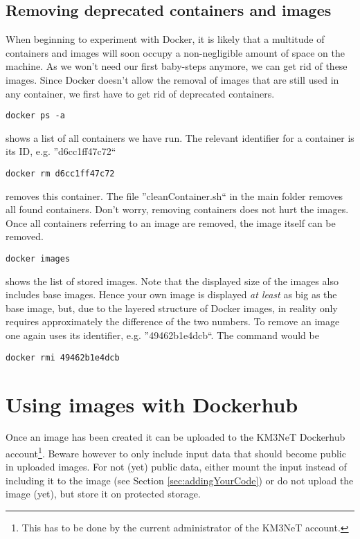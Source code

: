 \documentclass[a4paper, twoside, 11pt]{article}
\begin{document}
\subsection{Removing deprecated containers and images}
When beginning to experiment with Docker, it is likely that a multitude of containers and images will  
soon occupy a non-negligible amount of space on the machine. 
As we won't need our first baby-steps anymore, we can get rid of these images. 
Since Docker doesn't allow the removal of images that are still used in any container, 
we first have to get rid of deprecated containers. 
\begin{lstlisting}[basicstyle=\ttfamily\small,upquote=true,columns=flexible,keepspaces=true,frame=single]
docker ps -a
\end{lstlisting}
shows a list of all containers we have run. 
The relevant identifier for a container is its ID, e.g. ''d6cc1ff47c72``
\begin{lstlisting}[basicstyle=\ttfamily\small,upquote=true,columns=flexible,keepspaces=true,frame=single]
docker rm d6cc1ff47c72
\end{lstlisting}
removes this container. 
The file ''cleanContainer.sh`` in the main folder removes all found containers. 
Don't worry, removing containers does not hurt the images. 
Once all containers referring to an image are removed, the image itself can be removed.
\begin{lstlisting}[basicstyle=\ttfamily\small,upquote=true,columns=flexible,keepspaces=true,frame=single]
docker images
\end{lstlisting}
shows the list of stored images. 
Note that the displayed size of the images also includes base images. 
Hence your own image is displayed \textit{at least} as big as the base image, 
but, due to the layered structure of Docker images, in reality only requires approximately the difference of the two numbers. 
To remove an image one again uses its identifier, e.g. ''49462b1e4dcb``. 
The command would be 
\begin{lstlisting}[basicstyle=\ttfamily\small,upquote=true,columns=flexible,keepspaces=true,frame=single]
docker rmi 49462b1e4dcb
\end{lstlisting}

\section{Using images with Dockerhub}

Once an image has been created it can be uploaded to the 
KM3NeT Dockerhub account\footnote{This has to be done by the current administrator of the KM3NeT account.}. 
Beware however to only include input data that should become public in uploaded images. 
For not (yet) public data, either mount the input instead of including 
it to the image (see Section \ref{sec:addingYourCode}) 
or do not upload the image (yet), but store it on protected storage. 
\end{document}
